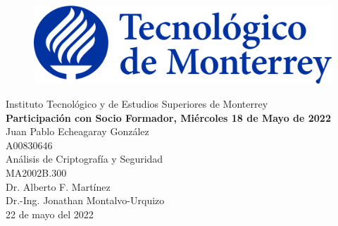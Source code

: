 \documentclass[12pt]{article}
\begin{document}
    \begin{titlepage}
        \begin{center}
            \begin{figure}
                \centering
                \includegraphics[scale=0.13]{../../logo_itesm.png}\\ %
            \end{figure}
        \vspace{5cm}
        \LARGE{Instituto Tecnológico y de Estudios Superiores de Monterrey}\\
        \fontsize{12}{14}\selectfont
        \vspace{1cm}
        \textbf{Participación con Socio Formador, Miércoles 18 de Mayo de 2022}\\ %
        \vspace{0.7cm}
        Juan Pablo Echeagaray González\\ %
        \vspace{0.2cm}
        A00830646\\ %
        \vspace{0.7cm}
        Análisis de Criptografía y Seguridad\\ %
        \vspace{0.2cm}
        MA2002B.300\\ %
        \vspace{0.2cm}
        Dr. Alberto F. Martínez \\ %
        \vspace{0.2cm}
        Dr.-Ing. Jonathan Montalvo-Urquizo \\
        \vspace{0.7cm}
        22 de mayo del 2022\\ %
        \end{center}
    \end{titlepage}
   
\end{document}
